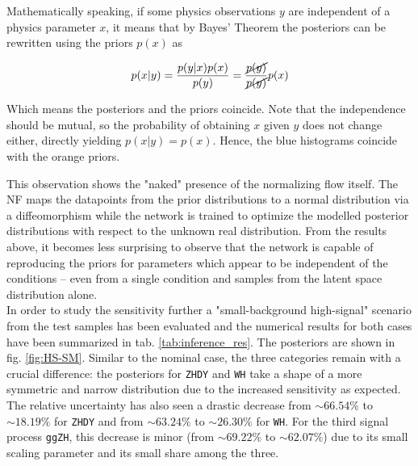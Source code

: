 Mathematically speaking, if some physics observations $y$ are independent of a physics parameter $x$, it means that by Bayes' Theorem the posteriors can be rewritten using the priors $p(x)$ as

\begin{equation*}
	p(x|y) = \frac{p(y|x)p(x)}{p(y)} = \frac{\cancel{p(y)}}{\cancel{p(y)}} p(x)
\end{equation*}

Which means the posteriors and the priors coincide. Note that the independence should be mutual, so the probability of obtaining $x$ given $y$ does not change either, directly yielding $p(x|y) = p(x)$. Hence, the blue histograms coincide with the orange priors.

This observation shows the "naked" presence of the normalizing flow itself. The NF maps the datapoints from the prior distributions to a normal distribution via a diffeomorphism while the network is trained to optimize the modelled posterior distributions with respect to the unknown real distribution. From the results above, it becomes less surprising to observe that the network is capable of reproducing the priors for parameters which appear to be independent of the conditions -- even from a single condition and samples from the latent space distribution alone.\\

In order to study the sensitivity further a "small-background high-signal" scenario from the test samples has been evaluated and the numerical results for both cases have been summarized in tab. \ref{tab:inference_res}. The posteriors are shown in fig. \ref{fig:HS-SM}. Similar to the nominal case, the three categories remain with a crucial difference: the posteriors for \texttt{ZHDY} and \texttt{WH} take a shape of a more symmetric and narrow distribution due to the increased sensitivity as expected. The relative uncertainty has also seen a drastic decrease from $\sim66.54\%$ to $\sim18.19\%$ for \texttt{ZHDY} and from $\sim63.24\%$ to $\sim26.30\%$ for \texttt{WH}. For the third signal process \texttt{ggZH}, this decrease is minor (from $\sim69.22\%$ to $\sim 62.07\%$) due to its small scaling parameter and its small share among the three.\\

